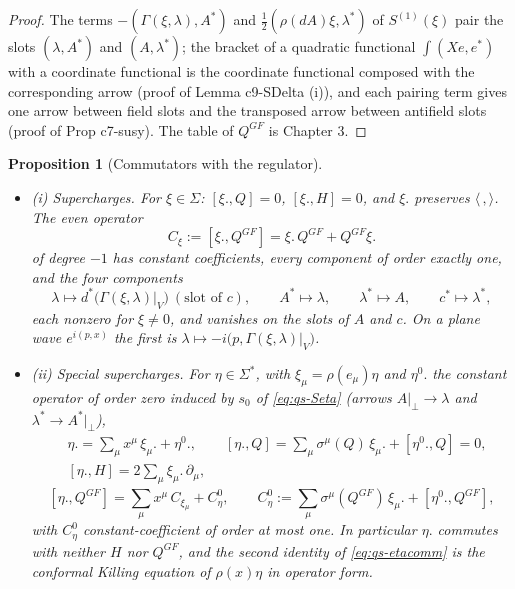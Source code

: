 \documentclass[11pt]{article}
\numberwithin{equation}{section}
\theoremstyle{plain}
\newtheorem{proposition}[theorem]{Proposition}
\theoremstyle{definition}
\newcommand{\Ap}{A|_{\perp}}
\begin{document}
\begin{proof}
The terms $-(\Gamma(\xi,\lambda),A^*)$ and $\tfrac12(\rho(dA)\xi,\lambda^*)$ of $S^{(1)}(\xi)$ pair the slots $(\lambda,A^*)$ and $(A,\lambda^*)$; the bracket of a quadratic functional $\int(Xe,e^*)$ with a coordinate functional is the coordinate functional composed with the corresponding arrow (proof of Lemma c9-SDelta (i)), and each pairing term gives one arrow between field slots and the transposed arrow between antifield slots (proof of Prop c7-susy). The table of $Q^{GF}$ is Chapter 3.
\end{proof}

\begin{proposition}[Commutators with the regulator]
\label{prop:qs-comm}
\begin{itemize}
\item (i) Supercharges. For $\xi\in\Sigma$: $[\xi.,Q]=0$, $[\xi.,H]=0$, and $\xi.$ preserves $\langle\,,\rangle$. The even operator
\begin{equation}
C_\xi:=[\xi.,Q^{GF}]=\xi.\,Q^{GF}+Q^{GF}\xi.
\label{eq:qs-Cxi}
\end{equation}
of degree $-1$ has constant coefficients, every component of order exactly one, and the four components
\[
\lambda\mapsto d^*\big(\Gamma(\xi,\lambda)|_V\big)\ (\text{slot of }c),\qquad A^*\mapsto\lambda,\qquad \lambda^*\mapsto A,\qquad c^*\mapsto\lambda^*,
\]
each nonzero for $\xi\neq0$, and vanishes on the slots of $A$ and $c$. On a plane wave $e^{i(p,x)}$ the first is $\lambda\mapsto-i\big(p,\Gamma(\xi,\lambda)|_V\big)$.
\item (ii) Special supercharges. For $\eta\in\Sigma^*$, with $\xi_\mu=\rho(e_\mu)\eta$ and $\eta^0.$ the constant operator of order zero induced by $s_0$ of \eqref{eq:qs-Seta} (arrows $\Ap\to\lambda$ and $\lambda^*\to A^*|_\perp$),
\begin{equation}
\begin{aligned}
&\eta.=\sum_\mu x^\mu\,\xi_\mu.+\eta^0.,\qquad [\eta.,Q]=\sum_\mu\sigma^\mu(Q)\,\xi_\mu.+[\eta^0.,Q]=0,\\
&[\eta.,H]=2\sum_\mu\xi_\mu.\,\partial_\mu,
\end{aligned}
\label{eq:qs-etacomm}
\end{equation}
\[
[\eta.,Q^{GF}]=\sum_\mu x^\mu\,C_{\xi_\mu}+C^0_\eta,\qquad C^0_\eta:=\sum_\mu\sigma^\mu(Q^{GF})\,\xi_\mu.+[\eta^0.,Q^{GF}],
\]
with $C^0_\eta$ constant-coefficient of order at most one. In particular $\eta.$ commutes with neither $H$ nor $Q^{GF}$, and the second identity of \eqref{eq:qs-etacomm} is the conformal Killing equation of $\rho(x)\eta$ in operator form.

\end{itemize}
\end{proposition}
\end{document}
